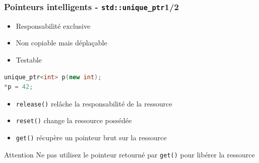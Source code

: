 \documentclass[C++.tex]{subfiles}
\begin{document}
\begin{frame}[fragile]
	\frametitle{Pointeurs intelligents - \lstinline|std::unique_ptr|\titlehfill{}1/2}
	\begin{itemize}
		\item Responsabilité exclusive
		\item Non copiable mais déplaçable
		\item Testable
	\end{itemize}

	\begin{lstlisting}[language=C++]
unique_ptr<int> p(new int);
*p = 42;\end{lstlisting}

	\begin{itemize}
		\item \lstinline|release()| relâche la responsabilité de la ressource


		\item \lstinline|reset()| change la ressource possédée


		\item \lstinline|get()| récupère un pointeur brut sur la ressource

	\end{itemize}

	\begin{alertblock}{Attention}
		Ne pas utilisez le pointeur retourné par \lstinline|get()| pour libérer la ressource
	\end{alertblock}
\end{frame}
\end{document}
